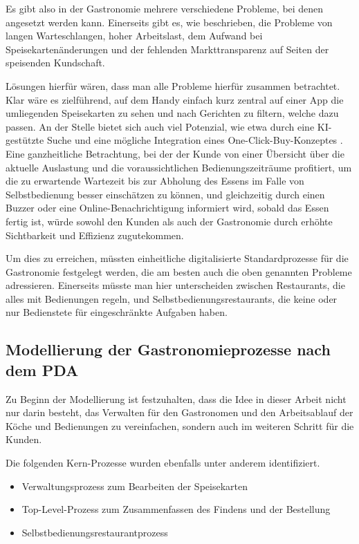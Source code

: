 Es gibt also in der Gastronomie mehrere verschiedene Probleme, bei denen angesetzt werden kann. Einerseits gibt es, wie beschrieben, die Probleme von langen Warteschlangen, hoher Arbeitslast, dem Aufwand bei Speisekartenänderungen und der fehlenden Markttransparenz auf Seiten der speisenden Kundschaft.

Lösungen hierfür wären, dass man alle Probleme hierfür zusammen betrachtet. Klar wäre es zielführend, auf dem Handy einfach kurz zentral auf einer App die umliegenden Speisekarten zu sehen und nach Gerichten zu filtern, welche dazu passen. An der Stelle bietet sich auch viel Potenzial, wie etwa durch eine KI-gestützte Suche und eine mögliche Integration eines One-Click-Buy-Konzeptes \citep[vgl.][]{amazon_oneclick_2025}. Eine ganzheitliche Betrachtung, bei der der Kunde von einer Übersicht über die aktuelle Auslastung und die voraussichtlichen Bedienungszeiträume profitiert, um die zu erwartende Wartezeit bis zur Abholung des Essens im Falle von Selbstbedienung besser einschätzen zu können, und gleichzeitig durch einen Buzzer oder eine Online-Benachrichtigung informiert wird, sobald das Essen fertig ist, würde sowohl den Kunden als auch der Gastronomie durch erhöhte Sichtbarkeit und Effizienz zugutekommen.

Um dies zu erreichen, müssten einheitliche digitalisierte Standardprozesse für die Gastronomie festgelegt werden, die am besten auch die oben genannten Probleme adressieren. Einerseits müsste man hier unterscheiden zwischen Restaurants, die alles mit Bedienungen regeln, und Selbstbedienungsrestaurants, die keine oder nur Bedienstete für eingeschränkte Aufgaben haben.

\subsection{Modellierung der Gastronomieprozesse nach dem \acl{PDA}}
\label{sec:modellierung}
Zu Beginn der Modellierung ist festzuhalten, dass die Idee in dieser Arbeit nicht nur darin besteht, das Verwalten für den Gastronomen und den Arbeitsablauf der Köche und Bedienungen zu vereinfachen, sondern auch im weiteren Schritt für die Kunden.

Die folgenden Kern-Prozesse wurden ebenfalls unter anderem identifiziert. 

\begin{itemize}
    \item Verwaltungsprozess zum Bearbeiten der Speisekarten
    \item Top-Level-Prozess zum Zusammenfassen des Findens und der Bestellung 
    \item Selbstbedienungsrestaurantprozess
\end{itemize}

